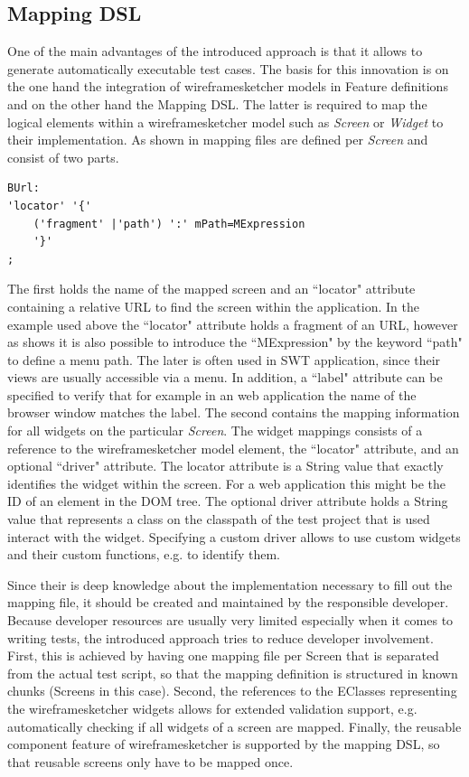 \documentclass{sig-alternate-05-2015}
\begin{document}
\subsection{Mapping DSL}
One of the main advantages of the introduced approach is that it allows to generate automatically executable test cases.
The basis for this innovation is on the one hand the integration of wireframesketcher models in Feature definitions and on the other hand the Mapping DSL.
The latter is required to map the logical elements within a wireframesketcher model such as \textit{Screen} or \textit{Widget} to their implementation.
As shown in  mapping files are defined per \textit{Screen} and consist of two parts.

\begin{lstlisting}[captionpos=b, caption=Mapping Grammar, label={lst:mappingGrammar}, language=xtext]
BUrl:
'locator' '{'
	('fragment' |'path') ':' mPath=MExpression
	'}'
;
\end{lstlisting}

The first holds the name of the mapped screen and an ``locator" attribute containing a relative URL to find the screen within the application.
In the example used above the ``locator" attribute holds a fragment of an URL, however as  shows it is also possible to introduce the ``MExpression" by the keyword ``path" to define a menu path.
The later is often used in SWT application, since their views are usually accessible via a menu.  
In addition, a ``label" attribute can be specified to verify that for example in an web application the name of the browser window matches the label.
The second contains the mapping information for all widgets on the particular \textit{Screen}.
The widget mappings consists of a reference to the wireframesketcher model element, the ``locator" attribute, and an optional ``driver" attribute.
The locator attribute is a String value that exactly identifies the widget within the screen.
For a web application this might be the ID of an element in the DOM tree.
The optional driver attribute holds a String value that represents a class on the classpath of the test project that is used interact with the widget.
Specifying a custom driver allows to use custom widgets and their custom functions, e.g. to identify them.

Since their is deep knowledge about the implementation necessary to fill out the mapping file, it should be created and maintained by the responsible developer. 
Because developer resources are usually very limited especially when it comes to writing tests, the introduced approach tries to reduce developer involvement.
First, this is achieved by having one mapping file per Screen that is separated from the actual test script, so that the mapping definition is structured in known chunks (Screens in this case). 
Second, the references to the EClasses representing the wireframesketcher widgets allows for extended validation support, e.g. automatically checking if all widgets of a screen are mapped.
Finally, the reusable component feature of wireframesketcher is supported by the mapping DSL, so that reusable screens only have to be mapped once.
\end{document}
